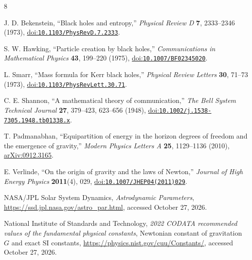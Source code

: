 \documentclass[12pt]{article}
\begin{document}
\begin{thebibliography}{8}
\small
{}
\raggedright
{}

J. D. Bekenstein,
``Black holes and entropy,''
\emph{Physical Review D} \textbf{7}, 2333--2346 (1973),
\href{https://doi.org/10.1103/PhysRevD.7.2333}{doi:\nolinkurl{10.1103/PhysRevD.7.2333}}.

S. W. Hawking,
``Particle creation by black holes,''
\emph{Communications in Mathematical Physics} \textbf{43}, 199--220 (1975),
\href{https://doi.org/10.1007/BF02345020}{doi:\nolinkurl{10.1007/BF02345020}}.

L. Smarr,
``Mass formula for Kerr black holes,''
\emph{Physical Review Letters} \textbf{30}, 71--73 (1973),
\href{https://doi.org/10.1103/PhysRevLett.30.71}{doi:\nolinkurl{10.1103/PhysRevLett.30.71}}.

C. E. Shannon,
``A mathematical theory of communication,''
\emph{The Bell System Technical Journal} \textbf{27}, 379--423, 623--656 (1948),
\href{https://doi.org/10.1002/j.1538-7305.1948.tb01338.x}{doi:\nolinkurl{10.1002/j.1538-7305.1948.tb01338.x}}.

T. Padmanabhan,
``Equipartition of energy in the horizon degrees of freedom and the emergence of gravity,''
\emph{Modern Physics Letters A} \textbf{25}, 1129--1136 (2010),
\href{https://arxiv.org/abs/0912.3165}{arXiv:0912.3165}.

E. Verlinde,
``On the origin of gravity and the laws of Newton,''
\emph{Journal of High Energy Physics} \textbf{2011}(4), 029,
\href{https://doi.org/10.1007/JHEP04(2011)029}{doi:\nolinkurl{10.1007/JHEP04(2011)029}}.

NASA/JPL Solar System Dynamics,
\emph{Astrodynamic Parameters},
\url{https://ssd.jpl.nasa.gov/astro_par.html},
accessed October 27, 2026.

National Institute of Standards and Technology,
\emph{2022 CODATA recommended values of the fundamental physical constants},
Newtonian constant of gravitation $G$ and exact SI constants,
\url{https://physics.nist.gov/cuu/Constants/},
accessed October 27, 2026.

\end{thebibliography}
\end{document}
